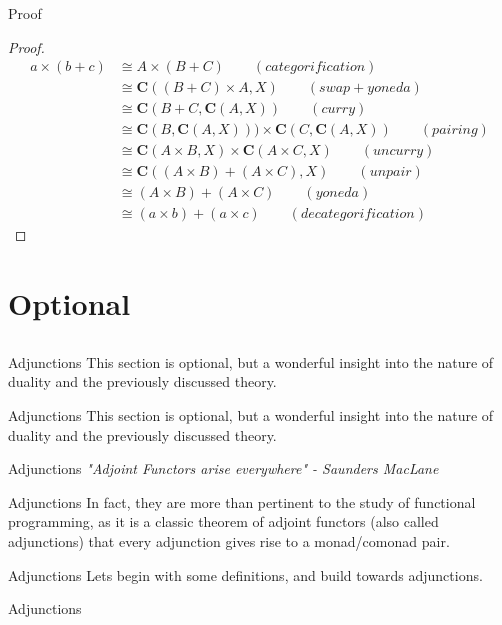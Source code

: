 \documentclass[tikz]{beamer}
\theoremstyle{definition}
\begin{document}
\begin{frame}{Proof}
 \begin{proof}{}
 \begin{align*}
     a \times (b + c) &\cong A \times (B + C) \qquad (categorification) \\
                      &\cong \mathbf{C}((B + C) \times A, X) \qquad (swap + yoneda) \\
                      &\cong \mathbf{C}(B + C, \mathbf{C}(A, X)) \qquad (curry)\\
                      &\cong \mathbf{C}(B, \mathbf{C}(A, X)))   \times \mathbf{C}(C, \mathbf{C}(A, X)) \qquad (pairing) \\
                      &\cong \mathbf{C}(A\times B, X) \times \mathbf{C}(A\times C, X) \qquad (uncurry) \\
                      &\cong \mathbf{C}((A \times B) + (A \times C), X) \qquad (unpair)\\
                      &\cong (A \times B) + (A \times C) \qquad (yoneda) \\
                      &\cong (a \times b) + (a \times c) \qquad (decategorification)
 \end{align*}{}
 \end{proof}
\end{frame}{}

\section{Optional}
\subsection{}

\begin{frame}{Adjunctions}
    This section is optional, but a wonderful insight into the nature of duality and the previously discussed theory. 
\end{frame}

\begin{frame}{Adjunctions}
    This section is optional, but a wonderful insight into the nature of duality and the previously discussed theory. 
\end{frame}

\begin{frame}{Adjunctions}
    \textit{"Adjoint Functors arise everywhere" - Saunders MacLane} 
\end{frame}

\begin{frame}{Adjunctions}
    In fact, they are more than pertinent to the study of functional programming, as it is a classic theorem of adjoint functors (also called adjunctions) that every adjunction gives rise to a monad/comonad pair. 
\end{frame}

\begin{frame}{Adjunctions}
    Lets begin with some definitions, and build towards adjunctions. 
\end{frame}

\begin{frame}{Adjunctions}
   
   \begin{definition}[Diagram]
   
   \end{definition}{} 
\end{frame}{}
\end{document}

